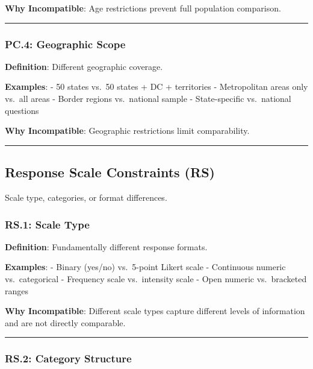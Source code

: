 \documentclass[
  letterpaper,
]{report}
\begin{document}
\textbf{Why Incompatible}: Age restrictions prevent full population
comparison.

\begin{center}\rule{0.5\linewidth}{0.5pt}\end{center}

\subsubsection{PC.4: Geographic Scope}\label{pc.4-geographic-scope}

\textbf{Definition}: Different geographic coverage.

\textbf{Examples}: - 50 states vs.~50 states + DC + territories -
Metropolitan areas only vs.~all areas - Border regions vs.~national
sample - State-specific vs.~national questions

\textbf{Why Incompatible}: Geographic restrictions limit comparability.

\begin{center}\rule{0.5\linewidth}{0.5pt}\end{center}

\subsection{Response Scale Constraints
(RS)}\label{response-scale-constraints-rs}

Scale type, categories, or format differences.

\subsubsection{RS.1: Scale Type}\label{rs.1-scale-type}

\textbf{Definition}: Fundamentally different response formats.

\textbf{Examples}: - Binary (yes/no) vs.~5-point Likert scale -
Continuous numeric vs.~categorical - Frequency scale vs.~intensity scale
- Open numeric vs.~bracketed ranges

\textbf{Why Incompatible}: Different scale types capture different
levels of information and are not directly comparable.

\begin{center}\rule{0.5\linewidth}{0.5pt}\end{center}

\subsubsection{RS.2: Category Structure}\label{rs.2-category-structure}
\end{document}
